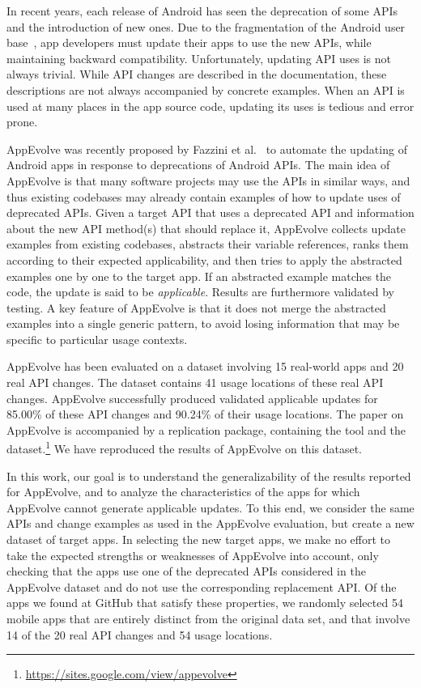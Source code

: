 In recent years, each release of Android has seen the deprecation of some
APIs and the introduction of new ones.  Due to the fragmentation of the
Android user base~\cite{he2018understanding,li2018cid}, app developers must
update their apps to use the new APIs, while maintaining backward
compatibility.  Unfortunately, updating API uses is not always trivial.
While API changes are described in the documentation, these descriptions
are not always accompanied by concrete examples.  When an API is used at
many places in the app source code, updating its uses is tedious and
error prone.

AppEvolve was recently proposed by Fazzini et
al.~\cite{fazzini2019automated} to automate the updating of Android apps in
response to deprecations of Android APIs.  The main idea of AppEvolve is
that many software projects may use the APIs in similar ways, and thus
existing codebases may already contain examples of how to update uses of
deprecated APIs.  Given a target API that uses a deprecated API and
information about the new API method(s) that should replace it, AppEvolve
collects update examples from existing codebases, abstracts their variable
references, ranks them according to their expected applicability, and then
tries to apply the abstracted examples one by one to the target app.  If an
abstracted example matches the code, the update is said to be {\em
applicable}.  Results are furthermore validated by testing.  A key feature
of AppEvolve is that it does not merge the abstracted examples into a
single generic pattern, to avoid losing information that may be specific to
particular usage contexts.

AppEvolve has been evaluated on a dataset involving 15 real-world apps and
20 real API changes. The dataset contains 41 usage locations of these real
API changes. AppEvolve successfully produced validated applicable updates
for 85.00\% of these API changes and 90.24\% of their usage locations.  The
paper on AppEvolve is accompanied by a replication package, containing the
tool and the
dataset.\footnote{\url{https://sites.google.com/view/appevolve}} We have
reproduced the results of AppEvolve on this dataset.

In this work, our goal is to understand the generalizability of the results
reported for AppEvolve, and to analyze the characteristics of the apps for
which AppEvolve cannot generate applicable updates.  To this end, we
consider the same APIs and change examples as used in the AppEvolve
evaluation, but create a new dataset of target apps.  In selecting the new
target apps, we make no effort to take the expected strengths or weaknesses
of AppEvolve into account, only checking that the apps use one of the
deprecated APIs considered in the AppEvolve dataset and do not use the
corresponding replacement API.  Of the apps we found at GitHub that satisfy
these properties, we randomly selected 54 mobile apps that are entirely
distinct from the original data set, and that involve 14 of the 20 real API
changes and 54 usage locations.

